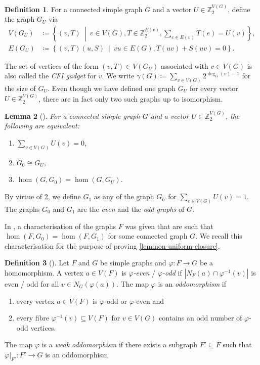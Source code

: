 \documentclass[11pt, DIV=15]{scrarticle}
\theoremstyle{definition}
\newtheorem{definition}{Definition}[section]
\theoremstyle{plain}
\newtheorem{lemma}[definition]{Lemma}
\theoremstyle{remark}
\renewcommand{\phi}{\varphi}
\begin{document}
	\begin{definition} \label{def:cfi}
		For a connected simple graph $G$ and a vector $U \in \mathbb{Z}_2^{V(G)}$, define the  graph $G_U$ via
		\begin{align*}
			V(G_U) &\coloneqq \left\{(v, T) \ \middle| \ v \in V(G), T \in \mathbb{Z}_2^{E(v)}, \sum_{e \in E(v)} T(e) = U(v) \right\}, \\
			E(G_U) &\coloneqq \left\{(v, T)(u, S) \ \middle|\ vu \in E(G), T(uv) + S(uv) = 0 \right\}.
		\end{align*}
	\end{definition}
	The set of vertices of the form $(v,T) \in V(G_U)$ associated with $v \in V(G)$ is also called the \emph{CFI gadget} for $v$.
	We write $\gamma(G) \coloneqq \sum_{v\in V(G)}2^{\deg_G(v) -1}$ for the size of $G_U$.
	Even though we have defined one graph $G_U$ for every vector $U \in \mathbb{Z}_2^{V(G)}$, there are in fact only two such graphs up to isomorphism.
	\begin{lemma}[{\cite[Corollary~3.7]{roberson_oddomorphisms_2022}}] \label{lem:cfi-hom-base-graph}
		For a connected simple graph $G$ and a vector $U \in \mathbb{Z}_2^{V(G)}$, the following are equivalent:
		\begin{enumerate}
			\item $\sum_{v \in V(G)} U(v) = 0$,
			\item $G_0 \cong G_U$,
			\item $\hom(G, G_0) = \hom(G, G_U)$.
		\end{enumerate}
	\end{lemma}
	
	By virtue of \cref{lem:cfi-hom-base-graph}, we define $G_1$ as any of the graph $G_U$ for $\sum_{v\in V(G)} U(v) = 1$.
	The graphs $G_0$ and $G_1$ are the \emph{even} and the \emph{odd  graphs} of $G$.
	
	In \cite{roberson_oddomorphisms_2022}, a characterisation of the graphs $F$ was given that are such that $\hom(F, G_0) = \hom(F, G_1)$ for some connected graph $G$.
	We recall this characterisation for the purpose of proving \cref{lem:non-uniform-closure}.
	
	\begin{definition}[{\cite[Definition~3.9]{roberson_oddomorphisms_2022}}]\label{def:oddomorphism}
		Let $F$ and $G$ be simple graphs and $\phi \colon F \to G$ be a homomorphism.
		A vertex $a \in V(F)$ is \emph{$\phi$-even} / \emph{$\phi$-odd} if $|N_F(a) \cap \phi^{-1}(v)|$ is even / odd for all $v \in N_G(\phi(a))$.
		The map $\phi$ is an \emph{oddomorphism} if 
		\begin{enumerate}
			\item every vertex $a \in V(F)$ is $\phi$-odd or $\phi$-even and
			\item every fibre $\phi^{-1}(v) \subseteq V(F)$ for $v \in V(G)$ contains an odd number of $\phi$-odd vertices.
		\end{enumerate}
		The map $\phi$ is a \emph{weak oddomorphism} if there exists a subgraph $F' \subseteq F$ such that $\phi|_{F'} \colon F' \to G$ is an oddomorphism.
	\end{definition}
\end{document}
